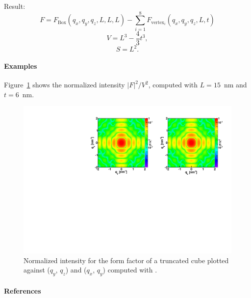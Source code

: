 Result:
\begin{equation*}
F =F_{\text{Box}}(q_x,q_y,q_z, L, L, L) - \sum_{i=1}^8 F_{\text{vertex}_i}(q_x, q_y, q_z, L, t)
\end{equation*}
\begin{equation*}
  V = L^3 - \dfrac{4}{3}t^3,
\end{equation*}
\begin{equation*}
  S = L^2.
\end{equation*}

\paragraph{Examples}
Figure~\ref{fig:FFtrunccubeEx} shows the normalized intensity
$|F|^2/V^2$, computed with $L=15$~nm  and $t=6$~nm.

\begin{figure}[H]
\begin{center}
\includegraphics[angle=-90,width=\textwidth]{fig/ff/figfftruncatedcube.pdf}
\end{center}
\caption{Normalized intensity for the form factor of a truncated cube plotted against ($q_y$, $q_z$) and  ($q_x$, $q_y$)
  computed with .}
\label{fig:FFtrunccubeEx}
\end{figure}

\paragraph{References}\strut\\
\cite{HeSS74}

\clearpage

